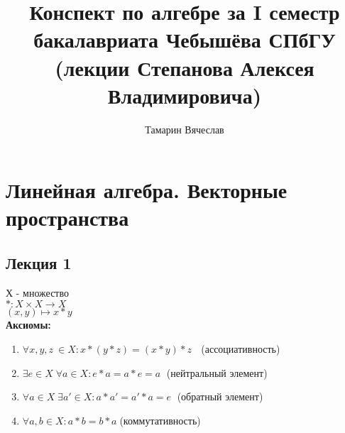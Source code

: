 \documentclass[12pt]{report}
\begin{document}
\renewcommand{\proofname}{Proof.}

\theoremstyle{plain}
\newtheorem{thm}{Theorem}[section]
\newtheorem*{lm}{Lemma}
\newtheorem*{st}{Statement}
\newtheorem*{prop}{Property}

\theoremstyle{definition}
\newtheorem{defn}{Def}
\newtheorem*{ex}{Ex}
\newtheorem*{exs}{Exs}
\newtheorem*{cor}{Corollary}
\newtheorem*{name}{Designation}

\theoremstyle{remark}
\newtheorem*{rem}{Remark}
\newtheorem*{com}{Comment}
\newtheorem*{note}{Note}
\newtheorem*{prac}{Practice}

\newcommand{\Z}{\mathbb{Z}}
\newcommand{\N}{\mathbb{N}}
\newcommand{\R}{\mathbb{R}}
\newcommand{\Q}{\mathbb{Q}}
\newcommand{\K}{\mathbb{K}}
\newcommand{\Cm}{\mathbb{C}}
\newcommand{\Pm}{\mathbb{P}}
\newcommand{\ilim}{\int\limits}
\newcommand{\slim}{\sum\limits}


\title{Конспект по алгебре за I семестр бакалавриата Чебышёва СПбГУ (лекции Степанова Алексея Владимировича)}                      
\author{Тамарин Вячеслав}
%  

\maketitle
\clearpage
\tableofcontents
\clearpage
\chapter{Линейная алгебра. Векторные пространства}
\section{Лекция 1}
Х - множество\\
$ *: X \times X \to X$\\
$ (x, y) \mapsto x * y$\\
{\bf Аксиомы:}
\begin{enumerate}
    \item $\forall x,y,z \: \in X: x*(y*z) = (x*y)*z$ $\;$ (ассоциативность)
    \item $\exists e \in X \; \forall a \in X: e*a = a*e = a \;$ (нейтральный элемент)
    \item $\forall a \in X \; \exists a' \in X: a*a' = a' * a = e \;$ (обратный элемент)
    \item $\forall a, b \in X: a * b = b * a \; $(коммутативность)
\end{enumerate}
\end{document}

